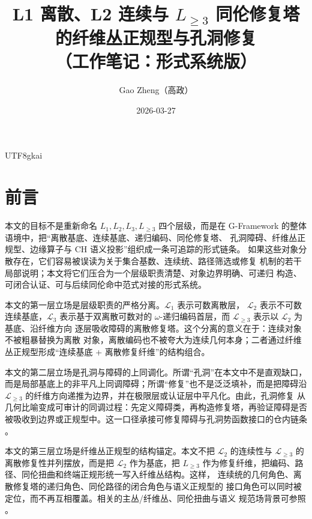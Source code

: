 \documentclass[12pt]{article}
\newcommand{\GFramework}{\textsf{G-Framework}}
\newcommand{\Lone}{\mathcal{L}_1}
\newcommand{\Ltwo}{\mathcal{L}_2}
\newcommand{\Lthree}{\mathcal{L}_3}
\newcommand{\Lge}{\mathcal{L}_{\ge 3}}
\begin{document}
\begin{CJK*}{UTF8}{gkai}

\title{L1 离散、L2 连续与 $L_{\ge 3}$ 同伦修复塔\\
的纤维丛正规型与孔洞修复\\
（工作笔记：形式系统版）}
\author{Gao Zheng（高政）}
\date{2026-03-27}
\maketitle

\section*{前言}

本文的目标不是重新命名 \(L_1,L_2,L_3,L_{\ge 3}\) 四个层级，而是在
\GFramework{} 的整体语境中，把“离散基底、连续基底、递归编码、同伦修复塔、
孔洞障碍、纤维丛正规型、边缘算子与 CH 语义投影”组织成一条可追踪的形式链条。
如果这些对象分散存在，它们容易被误读为关于集合基数、连续统、路径筛选或修复
机制的若干局部说明；本文将它们压合为一个层级职责清楚、对象边界明确、可递归
构造、可闭合认证、可与后续同伦命中范式对接的形式系统。

本文的第一层立场是层级职责的严格分离。\(\Lone\) 表示可数离散层，
\(\Ltwo\) 表示不可数连续基底，\(\Lthree\) 表示基于双离散可数对的
\(\omega\)-递归编码首层，而 \(\Lge\) 表示以 \(\Ltwo\) 为基底、沿纤维方向
逐层吸收障碍的离散修复塔。这个分离的意义在于：连续对象不被粗暴替换为离散
对象，离散编码也不被夸大为连续几何本身；二者通过纤维丛正规型形成“连续基底
+ 离散修复纤维”的结构组合。

本文的第二层立场是孔洞与障碍的上同调化。所谓“孔洞”在本文中不是直观缺口，
而是局部基底上的非平凡上同调障碍；所谓“修复”也不是泛泛填补，而是把障碍沿
\(\Lge\) 的纤维方向递推为边界，并在极限层或认证层中平凡化。由此，孔洞修复
从几何比喻变成可审计的同调过程：先定义障碍类，再构造修复塔，再验证障碍是否
被吸收到边界或正规型中。这一口径承接可修复障碍与孔洞势函数接口的仓内链条
\cite{RepoTex29RepairableObstruction,RepoTex32HoleObstruction}。

本文的第三层立场是纤维丛正规型的结构锚定。本文不把 \(\Ltwo\) 的连续性与
\(\Lge\) 的离散修复性并列摆放，而是把 \(\Ltwo\) 作为基底，把 \(L_{\ge3}\)
作为修复纤维，把编码、路径、同伦扭曲和终端正规形统一写入纤维丛结构。这样，
连续统的几何角色、离散修复塔的递归角色、同伦路径的闭合角色与语义正规型的
接口角色可以同时被定位，而不再互相覆盖。相关的主丛/纤维丛、同伦扭曲与语义
规范场背景可参照
\cite{RepoTex35ExtendedCertificationTower,RepoTex36HomotopyTwistBijection,RepoTex37SemanticGaugeRuntime}。


\end{CJK*}
\end{document}
